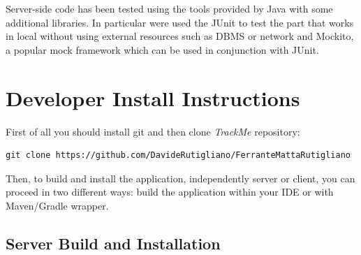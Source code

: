 \documentclass[a4paper]{article}
\begin{document}
Server-side code has been tested using the tools provided by Java with some additional libraries. In particular were used the JUnit to test the part that works in local without using external resources such as DBMS or network and Mockito, a popular mock framework which can be used in conjunction with JUnit.

\newpage
\section{Developer Install Instructions}
First of all you should install git and then clone \textit{TrackMe} repository:
\begin{lstlisting}
git clone https://github.com/DavideRutigliano/FerranteMattaRutigliano
\end{lstlisting}

Then, to build and install the application, independently server or client, you can proceed in two different ways: build the application within your IDE or with Maven/Gradle wrapper.
\subsection{Server Build and Installation}
\end{document}
